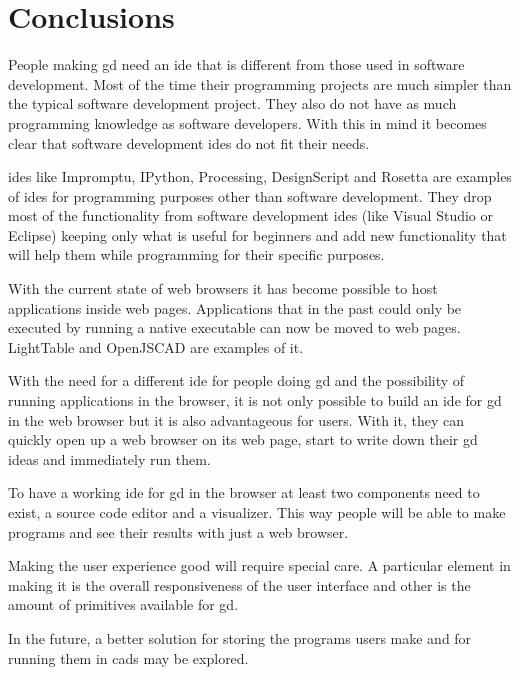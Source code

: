 \documentclass{./llncs2e/llncs}
\begin{document}
	

\section{Conclusions}
	People making \ac{gd} need an \ac{ide} that is different from those used in software development. 
	Most of the time their programming projects are much simpler than the typical software development project.
	They also do not have as much programming knowledge as software developers.
	With this in mind it becomes clear that software development \ac{ide}s do not fit their needs.
	
	\ac{ide}s like Impromptu, IPython, Processing, DesignScript and Rosetta are examples of \ac{ide}s for programming purposes other than software development.
	They drop most of the functionality from software development \ac{ide}s (like Visual Studio or Eclipse) keeping only what is useful for beginners and add new functionality that will help them while programming for their specific purposes.
	
	With the current state of web browsers it has become possible to host applications inside web pages. 
	Applications that in the past could only be executed by running a native executable can now be moved to web pages.
	LightTable and OpenJSCAD are examples of it.
	
	With the need for a different \ac{ide} for people doing \ac{gd} and the possibility of running applications in the browser, it is not only possible to build an \ac{ide} for \ac{gd} in the web browser but it is also advantageous for users.
	With it, they can quickly open up a web browser on its web page, start to write down their \ac{gd} ideas and immediately run them.
	
	To have a working \ac{ide} for \ac{gd} in the browser at least two components need to exist, a source code editor and a visualizer.
	This way people will be able to make programs and see their results with just a web browser.
	
	Making the user experience good will require special care.
	A particular element in making it is the overall responsiveness of the user interface and other is the amount of primitives available for \ac{gd}.
	
	In the future, a better solution for storing the programs users make and for running them in \ac{cad}s may be explored.
	
\newpage
\end{document}
